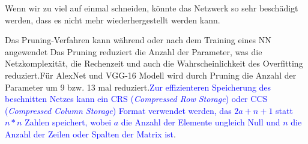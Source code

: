\documentclass[12pt,a4paper]{scrartcl}
\numberwithin{equation}{section}
\begin{document}
Wenn wir zu viel auf einmal schneiden, könnte das Netzwerk so sehr beschädigt werden, dass es nicht mehr wiederhergestellt werden kann.

 
Das Pruning-Verfahren kann  während oder nach dem Training eines \ac{NN} angewendet
Das Pruning reduziert die Anzahl der Parameter, was die Netzkomplexität, die Rechenzeit und auch die Wahrscheinlichkeit des Overfitting reduziert.Für AlexNet und VGG-16 Modell wird durch Pruning die Anzahl der Parameter um 9 bzw. 13 mal reduziert\cite{pruning}.\textcolor{blue}{Zur effizienteren Speicherung des beschnitten Netzes kann ein CRS (\textit{Compressed Row Storage}) oder CCS (\textit{Compressed Column Storage}) Format verwendet werden, das $ 2a+n+1 $ statt $ n*n $ Zahlen speichert, wobei $ a $ die Anzahl der Elemente ungleich Null und $ n $ die Anzahl der Zeilen oder Spalten der Matrix ist}. \\
\end{document}
